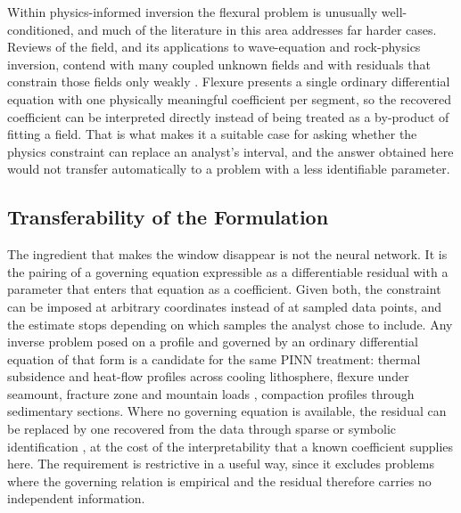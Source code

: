 \documentclass[final]{agujournal2019}
\begin{document}
Within physics-informed inversion the flexural problem is unusually
well-conditioned, and much of the literature in this area addresses far harder
cases. Reviews of the field, and its applications
to wave-equation and rock-physics inversion, contend with many coupled unknown
fields and with residuals that constrain those fields only weakly
\cite{Schuster2024,Li2024Probabilistic,Li2024Bayesian,Zhang2025GINN,ChengAlkhalifah2023,Qu2022Separate}.
Flexure presents a single ordinary differential equation with one physically meaningful
coefficient per segment, so the recovered coefficient can be interpreted
directly instead of being treated as a by-product of fitting a field. That is
what makes it a suitable case for asking whether the physics constraint can
replace an analyst's interval, and the answer obtained here would not transfer
automatically to a problem with a less identifiable parameter.

\subsection{Transferability of the Formulation}\label{sec:disc:transfer}

The ingredient that makes the window disappear is not the neural network. It is
the pairing of a governing equation expressible as a differentiable residual
with a parameter that enters that equation as a coefficient. Given both, the
constraint can be imposed at arbitrary coordinates instead of at sampled data
points, and the estimate stops depending on which samples the analyst chose to
include. Any inverse problem posed on a profile and governed by an ordinary
differential equation of that form is a candidate for the same PINN
treatment: thermal subsidence and
heat-flow profiles across cooling lithosphere, flexure under seamount, fracture
zone and mountain loads \cite{Sandwell1982,StewartWatts1997,Bodine1981},
compaction profiles through sedimentary sections. Where no governing equation is
available, the residual can be replaced by one recovered from the data through
sparse or symbolic identification
\cite{XuChangZhang2020,Chen2022SGA,XuZengZhang2023,MakkeChawla2024,UdrescuTegmark2020,MessengerBortz2021,Tibshirani1996},
at the cost of the interpretability that a known coefficient supplies here. The
requirement is restrictive in a useful way, since it excludes problems where the
governing relation is empirical and the residual therefore carries no
independent information.
\end{document}
